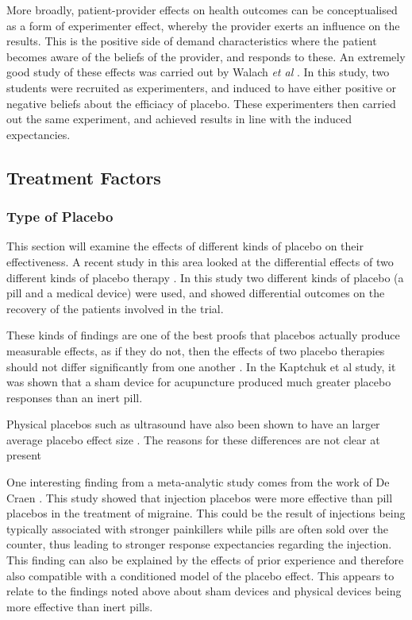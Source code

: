 More broadly, patient-provider effects on health outcomes can be conceptualised as a form of experimenter effect, whereby the provider exerts an influence on the results. This is the positive side of demand characteristics where the patient becomes aware of the beliefs of the provider, and responds to these. An extremely good study of these effects was carried out by Walach \textit{et al} \cite{Walach2002}. In this study, two students were recruited as experimenters, and induced to have either positive or negative beliefs about the efficiacy of placebo. These experimenters then carried out the same experiment, and achieved results in line with the induced expectancies. 


\subsection{Treatment Factors}

\subsubsection{Type of Placebo}
\label{sec:type-placebo}

This section will examine the effects of different kinds of placebo on their effectiveness. A recent study in this area looked at the differential effects of two different kinds of placebo therapy \cite{Kaptchuk2006}. In this study two different kinds of placebo (a pill and a medical device) were used, and showed differential outcomes on the recovery of the patients involved in the trial. 

These kinds of findings are one of the best proofs  that placebos actually produce measurable effects, as if they do not, then the effects of two placebo therapies should not differ significantly from one another \cite{Kaptchuk2006}. In the Kaptchuk et al study, it was shown that a sham device for acupuncture produced much greater placebo responses than an inert pill. 

Physical placebos such as ultrasound have also been shown to have an larger average placebo effect size \cite{Ernst1995b}.  The reasons for these differences are not clear at present%

One interesting finding from a meta-analytic study comes from the work of De Craen \cite{Craen2000}. This study showed that injection placebos were more effective than pill placebos in the treatment of migraine. This could be the result of injections being typically associated with stronger painkillers while pills are often sold over the counter, thus leading to stronger response expectancies regarding the injection. This finding can also be explained by the effects of prior experience and therefore also compatible with a conditioned model of the placebo effect. This appears to relate to the findings noted above about sham devices and physical devices being more effective than inert pills. 


